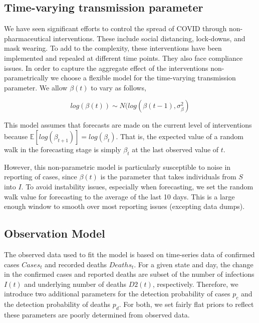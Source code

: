 \documentclass[11pt]{amsart}
\begin{document}
 
 
 

 
 \subsection{Time-varying transmission parameter}
 
We have seen significant efforts to control the spread of COVID through non-pharmaceutical interventions. These include social distancing, lock-downs, and mask wearing. To add to the complexity, these interventions have been implemented and repealed at different time points. They also face compliance issues. In order to capture the aggregate effect of the interventions non-parametrically we choose a flexible model for the time-varying transmission parameter.
We allow $\beta(t)$ to vary as follows, 

$$log(\beta(t)) \sim N(log(\beta(t-1), \sigma_{\beta}^2)$$

This model assumes that forecasts are made on the current level of interventions because $\mathbb{E}[log(\beta_{t+1})] = log(\beta_t)$. That is, the expected value of a random walk in the forecasting stage is simply $\beta_t$ at the last observed value of $t$. 

However, this non-parametric model is particularly susceptible to noise in reporting of cases, since $\beta(t)$ is the parameter that takes individuals from $S$ into $I$. To avoid instability issues, especially when forecasting, we set the random walk value for forecasting to the average of the last 10 days. This is a large enough window to smooth over most reporting issues (excepting data dumps). 


% 
 \subsection{Observation Model}
 
 The observed data used to fit the model is based on time-series data of confirmed cases $Cases_{t}$ and recorded deaths $Deaths_{t}$. 
For a given state and day, the change in the  confirmed cases and reported deaths are subset of the  number of infections $I(t)$ and underlying number of deaths $D2(t)$, respectively. Therefore, we introduce two additional parameters for the detection probability of cases $p_c$ and the detection probability of deaths $p_d$. For both, we set fairly flat priors to reflect these parameters are poorly determined from observed data.
\end{document}
